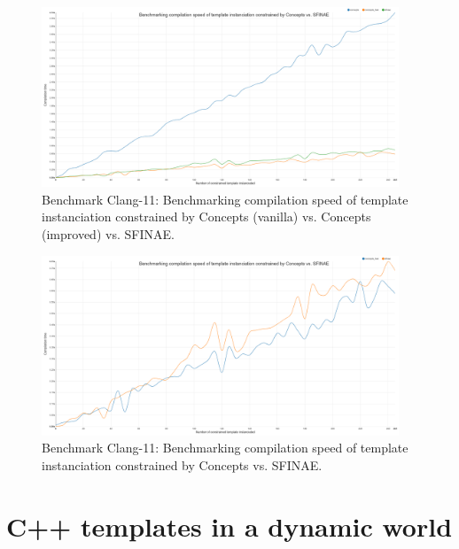 \begin{figure}[htb]
  \centering
  \includegraphics[width=4.2in]{figs/compile_time_benches/clang11/chart.concept.png}
  \caption{Benchmark Clang-11: Benchmarking compilation speed of template instanciation constrained by Concepts (vanilla) vs. Concepts (improved) vs. SFINAE.}
  \label{fig.gen.bench.clang11.1.concept.sfinae}
\end{figure}

\begin{figure}[htb]
  \centering
  \includegraphics[width=4.2in]{figs/compile_time_benches/clang11/chart.concept2.png}
  \caption{Benchmark Clang-11: Benchmarking compilation speed of template instanciation constrained by Concepts vs. SFINAE.}
  \label{fig.gen.bench.clang11.2.concept.sfinae}
\end{figure}


\section{C++ templates in a dynamic world}


